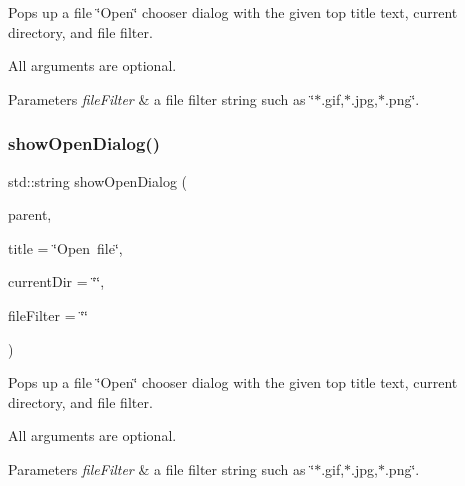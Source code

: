 Pops up a file \char`\"{}\+Open\char`\"{} chooser dialog with the given top title text, current directory, and file filter. 

All arguments are optional. 
\begin{DoxyParams}{Parameters}
{\em file\+Filter} & a file filter string such as \char`\"{}$\ast$.\+gif,$\ast$.\+jpg,$\ast$.\+png\char`\"{}. \\
\hline
\end{DoxyParams}
\mbox{\label{classGFileChooser_a1afbae9ad77732453d6978d3f643ce0b}} 
\subsubsection{\texorpdfstring{show\+Open\+Dialog()}{showOpenDialog()}\hspace{0.1cm}{\footnotesize\ttfamily [3/3]}}
{\footnotesize\ttfamily std\+::string show\+Open\+Dialog (\begin{DoxyParamCaption}\item[{Q\+Widget $\ast$}]{parent,  }\item[{const std\+::string \&}]{title = {\ttfamily \char`\"{}Open~file\char`\"{}},  }\item[{const std\+::string \&}]{current\+Dir = {\ttfamily \char`\"{}\char`\"{}},  }\item[{const std\+::string \&}]{file\+Filter = {\ttfamily \char`\"{}\char`\"{}} }\end{DoxyParamCaption})\hspace{0.3cm}{\ttfamily [static]}}



Pops up a file \char`\"{}\+Open\char`\"{} chooser dialog with the given top title text, current directory, and file filter. 

All arguments are optional. 
\begin{DoxyParams}{Parameters}
{\em file\+Filter} & a file filter string such as \char`\"{}$\ast$.\+gif,$\ast$.\+jpg,$\ast$.\+png\char`\"{}. \\
\hline
\end{DoxyParams}
\mbox{\label{classGFileChooser_a67fbf8f6091d781f22431051e3e83561}} 
